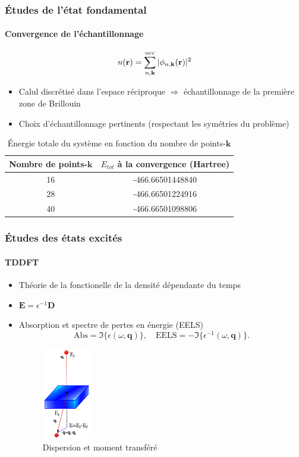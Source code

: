 \documentclass[french]{beamer}
\newcommand{\vb}[1]{\mathbf{#1}}
\newcommand{\V}[1]{\textnormal{#1}}
\begin{document}
\begin{frame}
\frametitle{Études de l'état fondamental}
\framesubtitle{Convergence de l'échantillonnage}

\begin{equation*}
  n(\vb{r}) = \sum_{n, \vb{k}}^{\V{occ}} |\phi_{n, \vb{k}}(\vb{r})|^2
\end{equation*}

\begin{itemize}
\item Calul discrétisé dans l'espace réciproque $\Longrightarrow$ échantillonnage de la première zone de Brillouin
\item Choix d'échantillonnage pertinents (respectant les symétries du problème)

\end{itemize}
\begin{table}[ht]
  \caption{Énergie totale du système en fonction du nombre de points-$\textbf{k}$}
  \centering
  \begin{tabular}{c c}
    \toprule
    Nombre de points-$\textbf{k}$  &  $E_{tot}$ à la convergence (Hartree)
    \\
    \midrule
    16    &  -466.66501448840
    \\
    28    &  -466.66501224916
    \\
    40    &  -466.66501098806
    \\
    \bottomrule
  \end{tabular}
\end{table}

\end{frame}

\begin{frame}
\frametitle{Études des états excités}
\framesubtitle{TDDFT}
\begin{itemize}
\item Théorie de la fonctionelle de la densité dépendante du temps
\item $\vb{E} = \epsilon^{-1}\vb{D}$
\item Absorption et spectre de pertes en énergie (EELS)
\begin{equation*}
  \textrm{Abs} = \Im\{\epsilon(\omega, \textbf{q})\},
  \quad
  \textrm{EELS} = -\Im\{\epsilon^{-1}(\omega, \textbf{q})\}.
\end{equation*}

\begin{figure}[!h]
  \includegraphics[width=0.2\textwidth]{eels}
  \caption{Dispersion et moment transféré}
\end{figure}
\end{itemize}
\end{frame}
\end{document}
